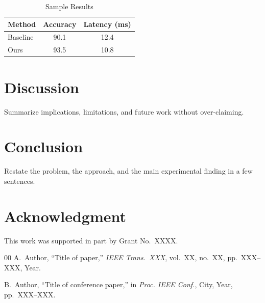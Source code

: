 \documentclass[conference]{IEEEtran}
\begin{document}
\begin{table}[!t]
\caption{Sample Results}
\label{tab:sample}
\begin{center}
\begin{tabular}{lcc}
\hline
Method & Accuracy & Latency (ms) \\
\hline
Baseline & 90.1 & 12.4 \\
Ours & 93.5 & 10.8 \\
\hline
\end{tabular}
\end{center}
\end{table}

\section{Discussion}
Summarize implications, limitations, and future work without over-claiming.

\section{Conclusion}
Restate the problem, the approach, and the main experimental finding in a few sentences.

\section*{Acknowledgment}
This work was supported in part by Grant No.~XXXX.

\begin{thebibliography}{00}
A.~Author, ``Title of paper,'' \textit{IEEE Trans.~XXX}, vol.~XX, no.~XX, pp.~XXX--XXX, Year.

B.~Author, ``Title of conference paper,'' in \textit{Proc. IEEE Conf.}, City, Year, pp.~XXX--XXX.
\end{thebibliography}
\end{document}
